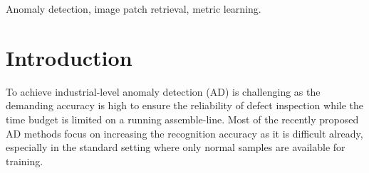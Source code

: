 \documentclass[lettersize,journal]{IEEEtran}
\begin{document}
\begin{IEEEkeywords}
  Anomaly detection, image patch retrieval, metric learning.
\end{IEEEkeywords}

\section{Introduction}
\label{sec:intro}
To achieve industrial-level anomaly detection (AD) is challenging as the demanding
accuracy is high to ensure the reliability of defect inspection while the time budget is
limited on a running assemble-line.
Most of the recently proposed AD methods focus on increasing the recognition accuracy as it is difficult already, especially in
the standard setting where only normal samples are available for training.
\end{document}
